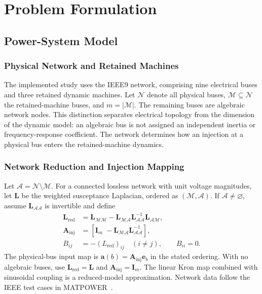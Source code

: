 \documentclass[journal]{IEEEtran}
\begin{document}
\section{Problem Formulation}
\label{sec:formulation}
\subsection{Power-System Model}
\label{sec:system-model}
\label{sec:ieee-system}
\subsubsection{Physical Network and Retained Machines}
The implemented study uses the IEEE9 network, comprising nine electrical
buses and three retained dynamic machines. Let $\mathcal N$ denote all physical
buses, $\mathcal M\subseteq\mathcal N$ the retained-machine buses, and
$m=|\mathcal M|$. The remaining buses are algebraic network nodes.
This distinction separates electrical topology from the dimension of the
dynamic model: an algebraic bus is not assigned an independent inertia or
frequency-response coefficient. The network determines how an injection at
a physical bus enters the retained-machine dynamics.

\subsubsection{Network Reduction and Injection Mapping}
Let $\mathcal A=\mathcal N\setminus\mathcal M$. For a connected lossless
network with unit voltage magnitudes, let
$\mathbf L$ be the weighted susceptance Laplacian, ordered as
$(\mathcal M,\mathcal A)$. If $\mathcal A\ne\varnothing$, assume
$\mathbf L_{\mathcal A\mathcal A}$ is invertible and define
\begin{align}
\mathbf L_{\mathrm{red}}&=\mathbf L_{\mathcal M\mathcal M}
-\mathbf L_{\mathcal M\mathcal A}\mathbf L_{\mathcal A\mathcal A}^{-1}
\mathbf L_{\mathcal A\mathcal M},\\
\mathbf A_{\mathrm{inj}}&=
\left[\mathbf I_m\; -\mathbf L_{\mathcal M\mathcal A}
\mathbf L_{\mathcal A\mathcal A}^{-1}\right],\\
B_{ij}&=-(L_{\mathrm{red}})_{ij}\quad(i\ne j),\qquad B_{ii}=0.
\label{eq:kron-map}
\end{align}
The physical-bus input map is $\mathbf a(b)=\mathbf A_{\mathrm{inj}}\mathbf e_b$
in the stated ordering. With no algebraic buses, use $\mathbf L_{\mathrm{red}}=\mathbf L$
and $\mathbf A_{\mathrm{inj}}=\mathbf I_m$. The linear Kron map combined with
sinusoidal coupling is a reduced-model approximation. Network data follow
the IEEE test cases in MATPOWER~\cite{zimmerman2011matpower}.
\end{document}
